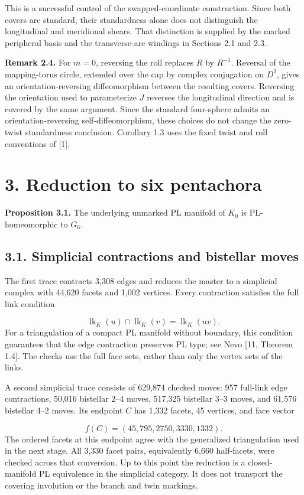 \documentclass[11pt,letterpaper]{article}
\begin{document}
This is a successful control of the swapped-coordinate construction. Since both covers are standard, their standardness alone does not distinguish the longitudinal and meridional shears. That distinction is supplied by the marked peripheral basis and the transverse-arc windings in Sections 2.1 and 2.3.

\medskip\noindent\textbf{Remark 2.4.} For $m=0$, reversing the roll replaces $R$ by $R^{-1}$. Reversal of the mapping-torus circle, extended over the cap by complex conjugation on $D^2$, gives an orientation-reversing diffeomorphism between the resulting covers. Reversing the orientation used to parameterize $J$ reverses the longitudinal direction and is covered by the same argument. Since the standard four-sphere admits an orientation-reversing self-diffeomorphism, these choices do not change the zero-twist standardness conclusion. Corollary 1.3 uses the fixed twist and roll conventions of [1].

\section*{3. Reduction to six pentachora}
\medskip\noindent\textbf{Proposition 3.1.} The underlying unmarked PL manifold of $K_0$ is PL-homeomorphic to $G_6$.

\subsection*{3.1. Simplicial contractions and bistellar moves}
The first trace contracts 3,308 edges and reduces the master to a simplicial complex with 44,620 facets and 1,002 vertices. Every contraction satisfies the full link condition

\[
\operatorname{lk}_{K}(u)\cap\operatorname{lk}_{K}(v)=\operatorname{lk}_{K}(uv).
\]
For a triangulation of a compact PL manifold without boundary, this condition guarantees that the edge contraction preserves PL type; see Nevo [11, Theorem 1.4]. The checks use the full face sets, rather than only the vertex sets of the links.

A second simplicial trace consists of 629,874 checked moves: 957 full-link edge contractions, 50,016 bistellar 2--4 moves, 517,325 bistellar 3--3 moves, and 61,576 bistellar 4--2 moves. Its endpoint $C$ has 1,332 facets, 45 vertices, and face vector

\[
f(C)=(45,795,2750,3330,1332).
\]
The ordered facets at this endpoint agree with the generalized triangulation used in the next stage. All 3,330 facet pairs, equivalently 6,660 half-facets, were checked across that conversion. Up to this point the reduction is a closed-manifold PL equivalence in the simplicial category. It does not transport the covering involution or the branch and twin markings.
\end{document}
